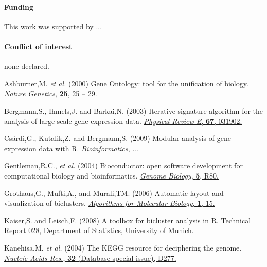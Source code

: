 \documentclass[round]{bioinfo}
\begin{document}

\paragraph{Funding\textcolon} This work was supported by ...

\paragraph{Conflict of interest\textcolon} none declared.

\begin{thebibliography}{6}

Ashburner,M. \emph{et al.} (2000)
Gene Ontology: tool for the unification of biology.
\href{http://dx.doi.org/10.1038/75556}{\emph{Nature Genetics}, {\bf 25}, 25 -- 29.}

Bergmann,S., Ihmels,J. and Barkai,N. (2003)
Iterative signature algorithm for the analysis of large-scale gene expression data.
\href{http://dx.doi.org/10.1103/PhysRevE.67.031902 }{\emph{Physical Review E}, {\bf 67}, 031902.}

Cs{\'a}rdi,G., Kutalik,Z. and Bergmann,S. (2009)
Modular analysis of gene expression data with R.
\href{http://dx.doi.org/}{\emph{Bioinformatics}, ...}

Gentleman,R.C., \emph{et al.} (2004)
Bioconductor: open software development for computational biology and bioinformatics.
\href{http://dx.doi.org/10.1186/gb-2004-5-10-r80}{\emph{Genome Biology}, {\bf 5}, R80.}

Grothaus,G., Mufti,A., and Murali,TM. (2006)
Automatic layout and visualization of biclusters.
\href{http://dx.doi.org/10.1186/1748-7188-1-15}{\emph{Algorithms for Molecular Biology}, {\bf 1}, 15.}

Kaiser,S. and Leisch,F. (2008)
A toolbox for bicluster analysis in R.
\href{http://epub.ub.uni-muenchen.de/3293/}{Technical Report 028, Department of Statistics, University of Munich}.

Kanehisa,M. \emph{et al.} (2004)
The KEGG resource for deciphering the genome.
\href{http://dx.doi.org/10.1093/nar/gkh063}{\emph{Nucleic Acids Res.}, {\bf 32} (Database special issue), D277.}


\end{thebibliography}
\end{document}
